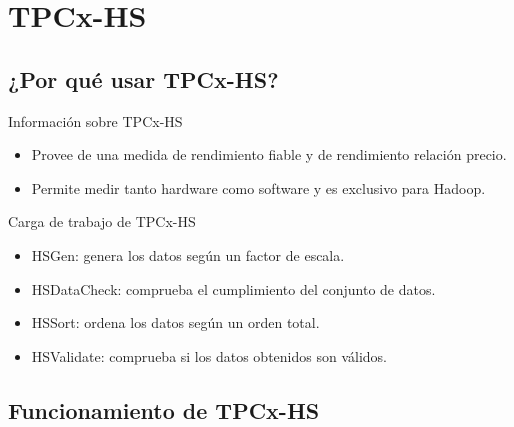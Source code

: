 
\section{TPCx-HS}

	\subsection*{¿Por qué usar TPCx-HS?}

		\begin{frame}{Información sobre TPCx-HS}
			\begin{itemize}
				\item Provee de una medida de rendimiento fiable y de rendimiento relación precio.
				\item Permite medir tanto hardware como software y es exclusivo para Hadoop.
			\end{itemize}
			
			{\color{ChetwodeBlue}\large Carga de trabajo de TPCx-HS}
			
			\begin{itemize}
				\item HSGen: genera los datos según un factor de escala.
				\item HSDataCheck: comprueba el cumplimiento del conjunto de datos.
				\item HSSort: ordena los datos según un orden total.
				\item HSValidate: comprueba si los datos obtenidos son válidos.
			\end{itemize}		
		\end{frame}
	
	\subsection*{Funcionamiento de TPCx-HS}	

